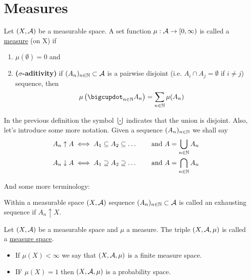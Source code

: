 
\chapter{Measures}

\begin{dfn}[Measure]
	Let $(X, \mathcal{A})$ be a measurable space. A set function $\mu: \mathcal{A} \to [0, \infty)$ is called a \underline{measure} (on X) if
	\begin{enumerate}
		\item $\mu(\emptyset) = 0$ and
		\item \textbf{($\sigma$-aditivity)} if $(A_n)_{n\in \mathbb{N}} \subset \mathcal{A}$ is a pairwise disjoint (i.e. $A_i \cap A_j = \emptyset$ if $i \neq j$) sequence, then
		\begin{align*}
			\mu\left(\bigcupdot_{n \in \N} A_n\right) = \sum_{n\in \N} \mu(A_n)
		\end{align*}
	\end{enumerate}
\end{dfn}

In the previous definition the symbol $\bigcupdot$ indicates that the union is disjoint. Also, let's introduce some more notation. Given a sequence $(A_n)_{n \in \mathbb{N}}$ we shall say
\begin{align*}
	A_n \uparrow A \iff A_1 \subseteq A_2 \subseteq \dots &\qquad\text{ and } A = \bigcup_{n \in \mathbb{N}} A_n \\
	A_n \downarrow A \iff A_1 \supseteq A_2 \supseteq \dots &\qquad\text{ and } A = \bigcap_{n \in \mathbb{N}} A_n
\end{align*}

And some more terminology:

\begin{dfn}
	Within a measurable space $(X, \mathcal{A})$ sequence $(A_n)_{n\in \mathbb{N}} \subset \mathcal{A}$ is called an exhausting sequence if $A_n \uparrow X$.
\end{dfn}

\begin{dfn}
	Let $(X, \mathcal{A})$ be a measurable space and $\mu$ a measure. The triple $(X, \mathcal{A}, \mu)$ is called a \underline{measure space}.
	
	\begin{itemize}
		\item If $\mu(X) < \infty$ we say that $(X, \mathcal{A}, \mu)$ is a finite measure space.
		\item IF $\mu(X) = 1$ then $(X, \mathcal{A}, \mu)$ is a probability space.
	\end{itemize}
\end{dfn}

